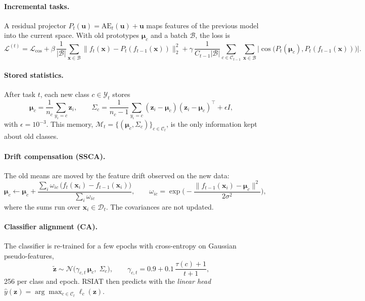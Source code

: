 \paragraph{Incremental tasks.}
A residual projector $P_t(\mathbf u)=\mathrm{AE}_t(\mathbf u)+\mathbf u$ maps
features of the previous model into the current space. With old prototypes
$\boldsymbol\mu_c$ and a batch $\mathcal B$, the loss is
\begin{equation}
  \mathcal L^{(t)}=\mathcal L_{\cos}
  +\beta\,\frac1{|\mathcal B|}\sum_{\mathbf x\in\mathcal B}\big\|f_t(\mathbf x)-P_t(f_{t-1}(\mathbf x))\big\|_2^2
  +\gamma\,\frac1{C_{t-1}|\mathcal B|}\sum_{c\in\mathcal C_{t-1}}\sum_{\mathbf x\in\mathcal B}
  \big|\cos\!\big(P_t(\boldsymbol\mu_c),P_t(f_{t-1}(\mathbf x))\big)\big|.
  \label{eq:inc}
\end{equation}

\paragraph{Stored statistics.}
After task $t$, each new class $c\in\mathcal Y_t$ stores
\begin{equation}
  \boldsymbol\mu_c=\frac1{n_c}\sum_{y_i=c}\mathbf z_i,\qquad
  \Sigma_c=\frac1{n_c-1}\sum_{y_i=c}(\mathbf z_i-\boldsymbol\mu_c)(\mathbf z_i-\boldsymbol\mu_c)^{\top}+\epsilon I,
  \label{eq:stats}
\end{equation}
with $\epsilon=10^{-3}$. This memory, $\mathcal M_t=\{(\boldsymbol\mu_c,\Sigma_c)\}_{c\in\mathcal C_t}$,
is the only information kept about old classes.

\paragraph{Drift compensation (SSCA).}
The old means are moved by the feature drift observed on the new data:
\begin{equation}
  \boldsymbol\mu_c\leftarrow\boldsymbol\mu_c+
  \frac{\sum_i\omega_{ic}\,\big(f_t(\mathbf x_i)-f_{t-1}(\mathbf x_i)\big)}{\sum_i\omega_{ic}},\qquad
  \omega_{ic}=\exp\!\Big(-\frac{\|f_{t-1}(\mathbf x_i)-\boldsymbol\mu_c\|^2}{2\sigma^2}\Big),
  \label{eq:ssca}
\end{equation}
where the sums run over $\mathbf x_i\in\mathcal D_t$. The covariances are not
updated.

\paragraph{Classifier alignment (CA).}
The classifier is re-trained for a few epochs with cross-entropy on Gaussian
pseudo-features,
\begin{equation}
  \tilde{\mathbf z}\sim\mathcal N\big(\gamma_{c,t}\,\boldsymbol\mu_c,\;\Sigma_c\big),\qquad
  \gamma_{c,t}=0.9+0.1\,\frac{\tau(c)+1}{t+1},
  \label{eq:ca}
\end{equation}
256 per class and epoch. RSIAT then predicts with the \emph{linear head}
$\hat y(\mathbf z)=\arg\max_{c\in\mathcal C_t}\ell_c(\mathbf z)$.

